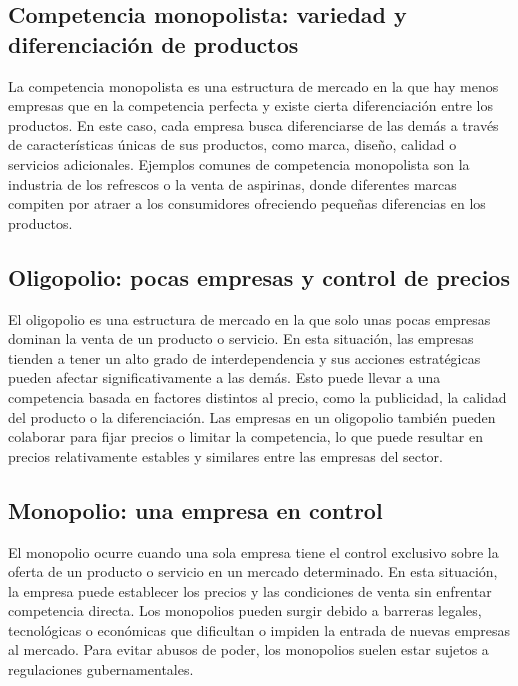 \documentclass[
  man,
  floatsintext,
  longtable,
  a4paper,
  nolmodern,
  notxfonts,
  notimes,
  12pt,
  colorlinks=true,linkcolor=blue,citecolor=blue,urlcolor=blue]{apa7}
\begin{document}
\subsection{Competencia monopolista: variedad y diferenciación de
productos}\label{competencia-monopolista-variedad-y-diferenciaciuxf3n-de-productos}

La competencia monopolista es una estructura de mercado en la que hay
menos empresas que en la competencia perfecta y existe cierta
diferenciación entre los productos. En este caso, cada empresa busca
diferenciarse de las demás a través de características únicas de sus
productos, como marca, diseño, calidad o servicios adicionales. Ejemplos
comunes de competencia monopolista son la industria de los refrescos o
la venta de aspirinas, donde diferentes marcas compiten por atraer a los
consumidores ofreciendo pequeñas diferencias en los productos.

\subsection{Oligopolio: pocas empresas y control de
precios}\label{oligopolio-pocas-empresas-y-control-de-precios}

El oligopolio es una estructura de mercado en la que solo unas pocas
empresas dominan la venta de un producto o servicio. En esta situación,
las empresas tienden a tener un alto grado de interdependencia y sus
acciones estratégicas pueden afectar significativamente a las demás.
Esto puede llevar a una competencia basada en factores distintos al
precio, como la publicidad, la calidad del producto o la diferenciación.
Las empresas en un oligopolio también pueden colaborar para fijar
precios o limitar la competencia, lo que puede resultar en precios
relativamente estables y similares entre las empresas del sector.

\subsection{Monopolio: una empresa en
control}\label{monopolio-una-empresa-en-control}

El monopolio ocurre cuando una sola empresa tiene el control exclusivo
sobre la oferta de un producto o servicio en un mercado determinado. En
esta situación, la empresa puede establecer los precios y las
condiciones de venta sin enfrentar competencia directa. Los monopolios
pueden surgir debido a barreras legales, tecnológicas o económicas que
dificultan o impiden la entrada de nuevas empresas al mercado. Para
evitar abusos de poder, los monopolios suelen estar sujetos a
regulaciones gubernamentales.
\end{document}
